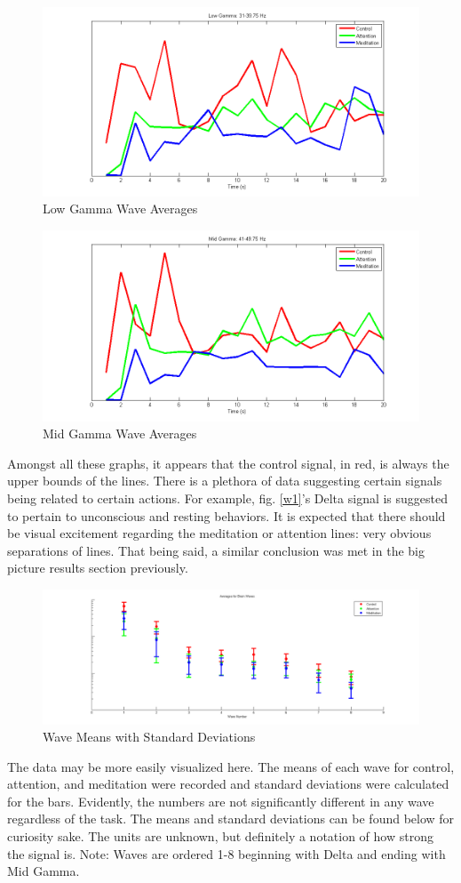 \documentclass[journal]{IEEEtran}
\begin{document}
\begin{figure}[H]
    \centering
    \includegraphics[width=.5\textwidth]{EEG/wave7}
    \caption{Low Gamma Wave Averages}
    \label{w7}
\end{figure}

\begin{figure}[H]
    \centering
    \includegraphics[width=.5\textwidth]{EEG/wave8}
    \caption{Mid Gamma Wave Averages}
    \label{w8}
\end{figure}


Amongst all these graphs, it appears that the control signal, in red, is always the upper bounds of the lines. There is a plethora of data suggesting certain signals being related to certain actions. For example, fig. \ref{w1}'s Delta signal is suggested to pertain to unconscious and resting behaviors. It is expected that there should be visual excitement regarding the meditation or attention lines: very obvious separations of lines. That being said, a similar conclusion was met in the big picture results section previously. \par

\begin{figure}[H]
    \centering
    \includegraphics[width=.5\textwidth]{EEG/wave_averages}
    \caption{Wave Means with Standard Deviations}
    \label{w_av}
\end{figure} 

The data may be more easily visualized here. The means of each wave for control, attention, and meditation were recorded and standard deviations were calculated for the bars. Evidently, the numbers are not significantly different in any wave regardless of the task. The means and standard deviations can be found below for curiosity sake. The units are unknown, but definitely a notation of how strong the signal is. Note: Waves are ordered 1-8 beginning with Delta and ending with Mid Gamma.
\end{document}
